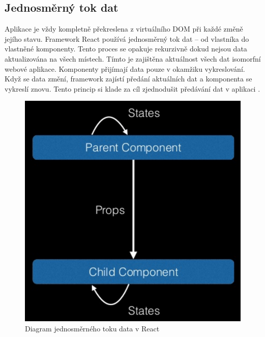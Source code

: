 \subsection{Jednosměrný tok dat}
Aplikace je vždy kompletně překreslena z virtuálního DOM při každé změně jejího stavu. Framework React používá jednosměrný tok dat – od vlastníka do vlastněné komponenty. Tento proces se opakuje rekurzivně dokud nejsou data aktualizována na všech místech. Tímto je zajištěna aktuálnost všech dat isomorfní webové aplikace. Komponenty přijímají data pouze v okamžiku vykreslování. Když se data změní, framework zajístí předání aktuálních dat a komponenta se vykreslí znovu. Tento princip si klade za cíl zjednodušit předávání dat v aplikaci \cite{react}.

\vspace{3mm}
\begin{figure}[h]
\begin{centering}
\includegraphics[scale=0.3]{obrazky/oneway_dataflow}
\par\end{centering}
\caption{Diagram jednosměrného toku data v React \cite{react} \label{fig:onewaydataflow}}
\end{figure}
\FloatBarrier

